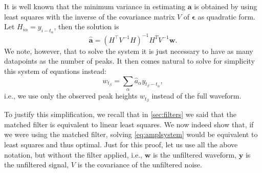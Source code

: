 It is well known that the minimum variance in estimating $\mathbf a$ is
obtained by using least squares with the inverse of the covariance matrix $V$
of $\boldsymbol\epsilon$ as quadratic form. Let $H_{i\alpha} = y_{i-t_\alpha}$,
then the solution is \cite[628]{zyla2020}
%
\begin{equation}
    \hat{\mathbf a} = (H^\top V^{-1} H)^{-1} H^T V^{-1} \mathbf w.
    \label{eq:lsq}
\end{equation}
%
We note, however, that to solve the system it is just necessary to have as many
datapoints as the number of peaks. It then comes natural to solve for
simplicity this system of equations instead:
%
\begin{equation}
    w_{t_\beta} = \sum_\alpha \hat a_\alpha y_{t_\beta - t_\alpha},
    \label{eq:amplsystem}
\end{equation}
%
i.e., we use only the observed peak heights $w_{t_\beta}$ instead of the full
waveform.

To justify this simplification, we recall that in \autoref{sec:filters} we said
that the matched filter is equivalent to linear least squares. We now indeed
show that, if we were using the matched filter, solving \eqref{eq:amplsystem}
would be equivalent to least squares and thus optimal. Just for this proof, let
us use all the above notation, but without the filter applied, i.e., $\mathbf
w$ is the unfiltered waveform, $\mathbf y$ is the unfiltered signal, $V$ is the
covariance of the unfiltered noise.

